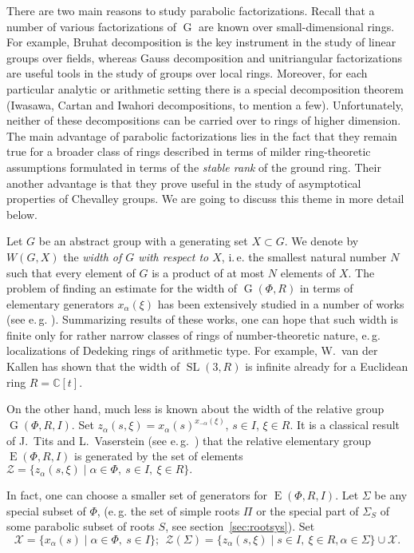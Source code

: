 \documentclass[12pt]{amsart}
\numberwithin{equation}{section}
\theoremstyle{definition}
\DeclareMathOperator{\G}{G}
\DeclareMathOperator{\SL}{SL}
\DeclareMathOperator{\E}{E}
\begin{document}
There are two main reasons to study parabolic factorizations.
Recall that a number of various factorizations of $\G$ are known over small-dimensional rings.
For example, Bruhat decomposition is the key instrument in the study of linear groups over fields, whereas Gauss decomposition and unitriangular factorizations are useful tools in the study of groups over local rings.
Moreover, for each particular analytic or arithmetic setting there is a special decomposition theorem (Iwasawa, Cartan and Iwahori decompositions, to mention a few).
Unfortunately, neither of these decompositions can be carried over to rings of higher dimension.
The main advantage of parabolic factorizations lies in the fact that they remain true for a broader class of rings described in terms of milder ring-theoretic assumptions formulated in terms of the \emph{stable rank} of the ground ring.
Their another advantage is that they prove useful in the study of asymptotical properties of Chevalley groups. We are going to discuss this theme in more detail below.

Let $G$ be an abstract group with a generating set $X \subset G$. 
We denote by $W(G, X)$ the \emph{width of $G$ with respect to $X$}, i.\,e. the smallest natural number $N$ such that every element of $G$ is a product of at most $N$ elements of $X$.
The problem of finding an estimate for the width of $\G(\Phi, R)$ in terms of elementary generators $x_\alpha(\xi)$ has been extensively studied in a number of works (see e.\,g. \cite{CK83, Ka82, Tavgen91, Mo07, VseUnitrZ1p, VavSmSuUnitrEng}).
Summarizing results of these works, one can hope that such width is finite only for rather narrow classes of rings of number-theoretic nature, e.\,g. localizations of Dedeking rings of arithmetic type.
For example, W.~van der Kallen has shown that the width of $\SL(3,R)$ is infinite already for a Euclidean ring $R=\mathbb{C}[t]$.

On the other hand, much less is known about the width of the relative group $\G(\Phi, R, I)$. 
Set $z_\alpha(s, \xi) = x_{\alpha}(s)^{x_{-\alpha}(\xi)}$, $s\in I$, $\xi\in R$.
It is a classical result of J.~Tits and L.~Vaserstein (see e.\,g.~\cite[Theorem~2]{Va86}) that the relative elementary group $\E(\Phi, R, I)$ is generated by
the set of elements $\mathcal{Z} = \{ z_\alpha(s,\xi) \mid \alpha \in \Phi,\ s\in I,\ \xi \in R \}.$

In fact, one can choose a smaller set of generators for $\E(\Phi, R, I)$. 
Let $\Sigma$ be any special subset of $\Phi$, (e.\,g. the set of simple roots $\Pi$ or the special part of $\Sigma_S$ of some parabolic subset of roots $S$, see section~\ref{sec:rootsys}).
Set $$\mathcal{X} = \{ x_\alpha(s) \mid \alpha\in \Phi,\ s\in I\};\ \ \mathcal{Z}(\Sigma) = \{ z_\alpha(s, \xi) \mid s \in I,\ \xi \in R, \alpha\in \Sigma \} \cup \mathcal{X}.$$ 
\end{document}

